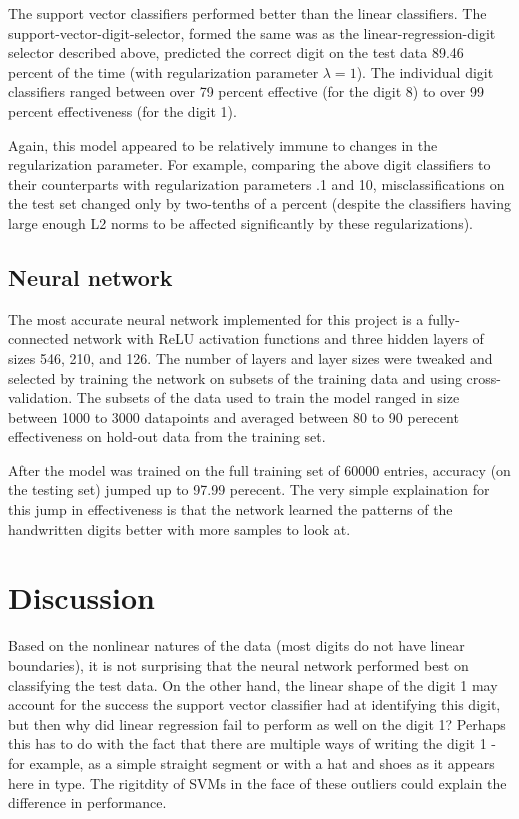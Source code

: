 \documentclass{article}
\begin{document}
The support vector classifiers performed better than the linear classifiers. The support-vector-digit-selector, formed the same was as the linear-regression-digit selector described above, predicted the correct digit on the test data 89.46 percent of the time (with regularization parameter $\lambda = 1$). The individual digit classifiers ranged between over 79 percent effective (for the digit 8) to over 99 percent effectiveness (for the digit 1). 

Again, this model appeared to be relatively immune to changes in the regularization parameter. For example, comparing the above digit classifiers to their counterparts with regularization parameters .1 and 10, misclassifications on the test set changed only by two-tenths of a percent (despite the classifiers having large enough L2 norms to be affected significantly by these regularizations).

\subsection{Neural network} 

The most accurate neural network implemented for this project is a fully-connected network with ReLU activation functions and three hidden layers of sizes 546, 210, and 126. The number of layers and layer sizes were tweaked and selected by training the network on subsets of the training data and using cross-validation. The subsets of the data used to train the model ranged in size between 1000 to 3000 datapoints and averaged between 80 to 90 perecent effectiveness on hold-out data from the training set. 

After the model was trained on the full training set of 60000 entries, accuracy (on the testing set) jumped up to 97.99 perecent. The very simple explaination for this jump in effectiveness is that the network learned the patterns of the handwritten digits better with more samples to look at. 


\section{Discussion} Based on the nonlinear natures of the data (most digits do not have linear boundaries), it is not surprising that the neural network performed best on classifying the test data. On the other hand, the linear shape of the digit 1 may account for the success the support vector classifier had at identifying this digit, but then why did linear regression fail to perform as well on the digit 1? Perhaps this has to do with the fact that there are multiple ways of writing the digit 1 - for example, as a simple straight segment or with a hat and shoes as it appears here in type. The rigitdity of SVMs in the face of these outliers could explain the difference in performance.
\end{document}

